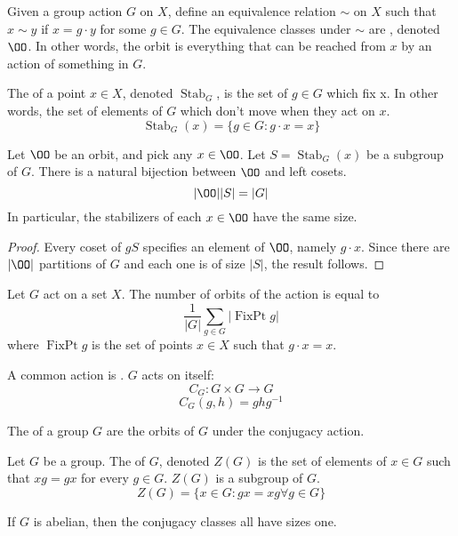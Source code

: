 \documentclass{article}
\begin{document}
\begin{defn}
  Given a group action $G$ on $X$, define an equivalence relation $\sim$ on $X$ such that
  $x \sim y$ if $x = g \cdot y$ for some $g \in G$. The equivalence classes under $\sim$ are
  , denoted $\OO$. In other words, the orbit is everything that can be reached
  from $x$ by an action of something in $G$. 
\end{defn}

\begin{defn}
  The  of a point $x \in X$, denoted $\operatorname{Stab}_G$, is
  the set of $g \in G$ which fix x. In other words, the set of elements of $G$ which don't
  move when they act on $x$.
  $$\operatorname{Stab}_G(x) = \{g \in G : g \cdot x = x\}$$
\end{defn}

\begin{nthm}
  Let $\OO$ be an orbit, and pick any $x \in \OO$. Let $S = \operatorname{Stab}_G(x)$
  be a subgroup of $G$. There is a natural bijection between $\OO$ and left cosets.
  $$|\OO||S| = |G|$$
  In particular, the stabilizers of each $x \in \OO$ have the same size. 
\end{nthm}

\begin{proof}
  Every coset of $gS$ specifies an element of $\OO$, namely $g \cdot x$. Since
  there are $|\OO|$ partitions of $G$ and each one is of size $|S|$,
  the result follows.   
\end{proof}

\begin{nthm}
  Let $G$ act on a set $X$. The number of orbits of the action is equal to
  $$\frac{1}{|G|} \sum\limits_{g \in G} |\operatorname{FixPt} g|$$
  where $\operatorname{FixPt} g$ is the set of points $x \in X$ such that
  $g \cdot x = x$. 
\end{nthm}

\begin{defn}
  A common action is . $G$ acts on itself:
  $$C_G : G \times G \rightarrow G$$
  $$C_G(g, h) = ghg^{-1}$$
\end{defn}

\begin{defn}
  The  of a group $G$ are the orbits of $G$ under the
  conjugacy action. 
\end{defn}

\begin{defn}
  Let $G$ be a group. The  of $G$, denoted $Z(G)$ is the set of
  elements of $x \in G$ such that $xg = gx$ for every $g \in G$. $Z(G)$ is a subgroup
  of $G$. 
  $$Z(G) = \{x \in G : gx = xg \forall g \in G\}$$
\end{defn}

\begin{remark}
  If $G$ is abelian, then the conjugacy classes all have sizes one. 
\end{remark}
\end{document}
